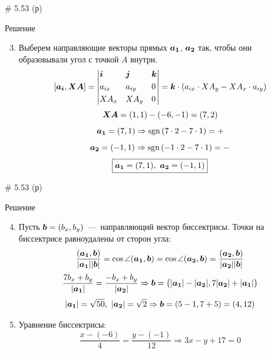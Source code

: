 \documentclass[russian]{beamer}
\begin{document}
  \begin{frame}{\# 5.53 (р)}
    \begin{block}{Решение}
      \begin{enumerate}
        \setcounter{enumi}{2}
        
        \item Выберем направляющие векторы прямых $\boldsymbol{a_1}$, $\boldsymbol{a_2}$ так, чтобы они образовывали угол с точкой $A$ внутри.
        \[
          [\boldsymbol{a_i}, \boldsymbol{XA}] = \left|
            \begin{aligned}
              &\boldsymbol i & &\boldsymbol j & &\boldsymbol k\\
              &a_{ix} & &a_{iy} & &0\\
              &XA_x & &XA_y & &0
            \end{aligned}
          \right|
          = \boldsymbol k \cdot (a_{ix} \cdot XA_y - XA_x \cdot a_{iy})
        \]
        \[
          \boldsymbol{XA} = (1, 1) - (-6, -1) = (7, 2)
        \]
        \[
          \boldsymbol{a_1} = (7, 1) \Rightarrow \operatorname{sgn}{(7 \cdot 2 - 7 \cdot 1)} = +
        \]
        \[
          \boldsymbol{a_2} = (-1, 1) \Rightarrow \operatorname{sgn}{(-1 \cdot 2 - 7 \cdot 1)} = -
        \]
        \[
          \boxed{\boldsymbol{a_1} = (7, 1),\ \boldsymbol{a_2} = (-1, 1)}
        \]
      \end{enumerate}
    \end{block}
  \end{frame}


  \begin{frame}{\# 5.53 (р)}
    \begin{block}{Решение}
      \begin{enumerate}
        \setcounter{enumi}{3}
        
        \item Пусть $\bds b \hm= (b_x, b_y)$~---~направляющий вектор биссектрисы. Точки на биссектрисе равноудалены от сторон угла:
        \[
          \frac{(\boldsymbol{a_1}, \boldsymbol b)}{|\boldsymbol{a_1}||\boldsymbol b|} = \cos \angle (\boldsymbol{a_1}, \boldsymbol b)
          = \cos \angle (\boldsymbol{a_2}, \boldsymbol b)
          = \frac{(\boldsymbol{a_2}, \boldsymbol b)}{|\boldsymbol{a_2}||\boldsymbol b|}
        \]
        \[
          \frac{7 b_x + b_y}{|\boldsymbol{a_1}|} = \frac{-b_x + b_y}{|\boldsymbol{a_2}|}
          \Rightarrow
          \boldsymbol b = \bigl(|\boldsymbol{a_1}| - |\boldsymbol{a_2}|, 7|\boldsymbol{a_2}| + |\boldsymbol{a_1}|\bigr)
        \]
        \[
          |\boldsymbol{a_1}| = \sqrt{50},\ |\boldsymbol{a_2}| = \sqrt{2} \Rightarrow \boldsymbol b = (5 - 1, 7 + 5) = (4, 12)
        \]
        
        \pause
        
        \item Уравнение биссектрисы:
        \[
          \frac{x - (-6)}{4} = \frac{y - (-1)}{12}
          \Rightarrow \boxed{3x - y + 17 = 0}
        \]
      \end{enumerate}
    \end{block}
  \end{frame}
\end{document}
